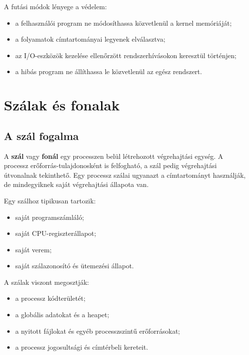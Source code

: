 A futási módok lényege a védelem:

\begin{itemize}
  \item a felhasználói program ne módosíthassa közvetlenül a kernel memóriáját;
  \item a folyamatok címtartományai legyenek elválasztva;
  \item az I/O-eszközök kezelése ellenőrzött rendszerhívásokon keresztül történjen;
  \item a hibás program ne állíthassa le közvetlenül az egész rendszert.
\end{itemize}

\section{Szálak és fonalak}

\subsection{A szál fogalma}

A \textbf{szál} vagy \textbf{fonál} egy processzen belül létrehozott végrehajtási egység. A processz erőforrás-tulajdonosként is felfogható, a szál pedig végrehajtási útvonalnak tekinthető. Egy processz szálai ugyanazt a címtartományt használják, de mindegyiknek saját végrehajtási állapota van.

Egy szálhoz tipikusan tartozik:

\begin{itemize}
  \item saját programszámláló;
  \item saját CPU-regiszterállapot;
  \item saját verem;
  \item saját szálazonosító és ütemezési állapot.
\end{itemize}

A szálak viszont megosztják:

\begin{itemize}
  \item a processz kódterületét;
  \item a globális adatokat és a heapet;
  \item a nyitott fájlokat és egyéb processzszintű erőforrásokat;
  \item a processz jogosultsági és címtérbeli kereteit.
\end{itemize}



